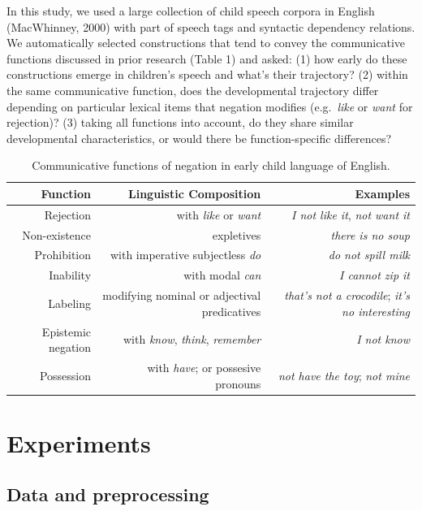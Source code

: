 \documentclass[10pt, letterpaper]{article}
\begin{document}
In this study, we used a large collection of child speech corpora in
English (MacWhinney, 2000) with part of speech tags and syntactic
dependency relations. We automatically selected constructions that tend
to convey the communicative functions discussed in prior research (Table
1) and asked: (1) how early do these constructions emerge in children's
speech and what's their trajectory? (2) within the same communicative
function, does the developmental trajectory differ depending on
particular lexical items that negation modifies (e.g.~\emph{like} or
\emph{want} for rejection)? (3) taking all functions into account, do
they share similar developmental characteristics, or would there be
function-specific differences?

\begin{table}[h]
\small
\centering
\begin{tabular}{rrr}
  \hline
 \textbf{Function} & \textbf{Linguistic Composition} & \textbf{Examples} \\
  \hline
Rejection & with \textit{like} or \textit{want} & \textit{I not like it}, \textit{not want it}  \\
Non-existence & expletives & \textit{there is no soup} \\
Prohibition & with imperative subjectless \textit{do} & \textit{do not spill milk} \\
Inability & with modal \textit{can} & \textit{I cannot zip it} \\
Labeling & modifying nominal or adjectival predicatives & \textit{that's not a crocodile}; \textit{it's no interesting} \\
Epistemic negation & with \textit{know}, \textit{think}, \textit{remember}  & \textit{I not know} \\
Possession & with \textit{have}; or possesive pronouns & \textit{not have the toy}; \textit{not mine} \\
   \hline
\end{tabular}
\caption{Communicative functions of negation in early child language of English.}
\end{table}

\hypertarget{experiments}{%
\section{Experiments}\label{experiments}}

\hypertarget{data-and-preprocessing}{%
\subsection{Data and preprocessing}\label{data-and-preprocessing}}
\end{document}
